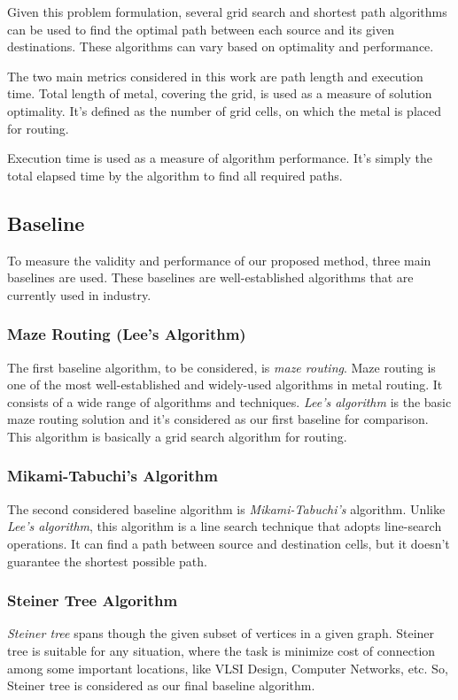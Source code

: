 Given this problem formulation, several grid search and shortest path algorithms can be used to find the optimal path between each source and its given destinations. These algorithms can vary based on optimality and performance.

The two main metrics considered in this work are path length and execution time. Total length of metal, covering the grid, is used as a measure of solution optimality. It's defined as the number of grid cells, on which the metal is placed for routing.

Execution time is used as a measure of algorithm performance. It's simply the total elapsed time by the algorithm to find all required paths.

\subsection{Baseline}
To measure the validity and performance of our proposed method, three main baselines are used. These baselines are well-established algorithms that are currently used in industry.

\subsubsection{Maze Routing (Lee's Algorithm)}
The first baseline algorithm, to be considered, is \emph{maze routing}. Maze routing is one of the most well-established and widely-used algorithms in metal routing. It consists of a wide range of algorithms and techniques. \emph{Lee's algorithm} is the basic maze routing solution and it's considered as our first baseline for comparison. This algorithm is basically a grid search algorithm for routing.

\subsubsection{Mikami-Tabuchi’s Algorithm}
The second considered baseline algorithm is \emph{Mikami-Tabuchi’s} algorithm. Unlike \emph{Lee's algorithm}, this algorithm is a line search technique that adopts line-search operations. It can find a path between source and destination cells, but it doesn't guarantee the shortest possible path.   

\subsubsection{Steiner Tree Algorithm}
\emph{Steiner tree} spans though the given subset of vertices in a given graph. Steiner tree is suitable for any situation, where the task is minimize cost of connection among some important locations, like VLSI Design, Computer Networks, etc. So, Steiner tree is considered as our final baseline algorithm.

